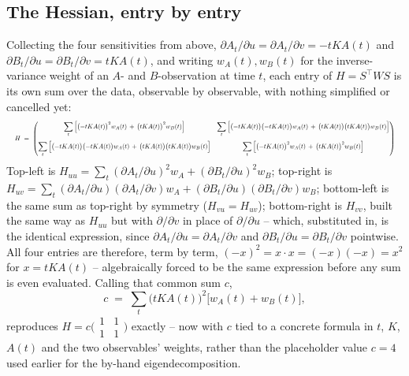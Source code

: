 \documentclass[11pt]{article}
\begin{document}
\subsection*{The Hessian, entry by entry}

Collecting the four sensitivities from above, $\partial A_t/\partial u =
\partial A_t/\partial v = -tKA(t)$ and $\partial B_t/\partial u = \partial
B_t/\partial v = tKA(t)$, and writing $w_A(t), w_B(t)$ for the inverse-variance
weight of an $A$- and $B$-observation at time $t$, each entry of $H=S^\top WS$
is its own sum over the data, observable by observable, with nothing
simplified or cancelled yet:
\begin{equation}
  \resizebox{\textwidth}{!}{$
  H \;=\;
  \begin{pmatrix}
    \displaystyle\sum_t\Big[\big({-}tKA(t)\big)^2 w_A(t) \,+\, \big(tKA(t)\big)^2 w_B(t)\Big]
    &
    \displaystyle\sum_t\Big[\big({-}tKA(t)\big)\big({-}tKA(t)\big) w_A(t) \,+\, \big(tKA(t)\big)\big(tKA(t)\big) w_B(t)\Big]
    \\[16pt]
    \displaystyle\sum_t\Big[\big({-}tKA(t)\big)\big({-}tKA(t)\big) w_A(t) \,+\, \big(tKA(t)\big)\big(tKA(t)\big) w_B(t)\Big]
    &
    \displaystyle\sum_t\Big[\big({-}tKA(t)\big)^2 w_A(t) \,+\, \big(tKA(t)\big)^2 w_B(t)\Big]
  \end{pmatrix}
  $}
\end{equation}
Top-left is $H_{uu}=\sum_t(\partial A_t/\partial u)^2w_A + (\partial
B_t/\partial u)^2w_B$; top-right is $H_{uv}=\sum_t(\partial A_t/\partial
u)(\partial A_t/\partial v)w_A + (\partial B_t/\partial u)(\partial
B_t/\partial v)w_B$; bottom-left is the same sum as top-right by symmetry
($H_{vu}=H_{uv}$); bottom-right is $H_{vv}$, built the same way as $H_{uu}$
but with $\partial/\partial v$ in place of $\partial/\partial u$ -- which,
substituted in, is the identical expression, since $\partial A_t/\partial u
=\partial A_t/\partial v$ and $\partial B_t/\partial u=\partial B_t/\partial
v$ pointwise. All four entries are therefore, term by term,
$({-}x)^2=x\cdot x=({-}x)({-}x)=x^2$ for $x=tKA(t)$ -- algebraically forced to
be the same expression before any sum is even evaluated. Calling that common
sum $c$,
\begin{equation}
  c \;=\; \sum_t \big(tKA(t)\big)^2\big[w_A(t)+w_B(t)\big],
\end{equation}
reproduces $H=c\big(\begin{smallmatrix}1&1\\1&1\end{smallmatrix}\big)$ exactly
-- now with $c$ tied to a concrete formula in $t$, $K$, $A(t)$ and the two
observables' weights, rather than the placeholder value $c=4$ used earlier for
the by-hand eigendecomposition.
\end{document}
